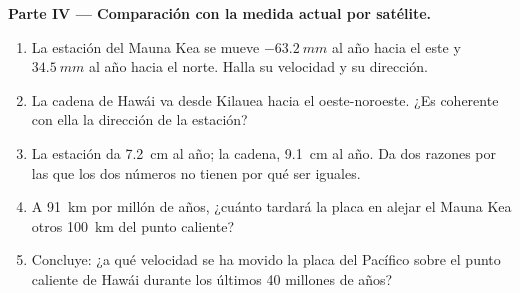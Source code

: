 \begin{problem}
\medskip
\noindent\textbf{Parte IV --- Comparación con la medida actual por satélite.}
\begin{enumerate}[resume]
  \item La estación del Mauna Kea se mueve $\qty{-63.2}{mm}$ al año hacia el
        este y $\qty{+34.5}{mm}$ al año hacia el norte. Halla su velocidad y su
        dirección.
  \item La cadena de Hawái va desde Kilauea hacia el oeste-noroeste. ¿Es
        coherente con ella la dirección de la estación?
  \item La estación da \qty{7.2}{cm} al año; la cadena, \qty{9.1}{cm} al año.
        Da dos razones por las que los dos números no tienen por qué ser iguales.
  \item A \qty{91}{km} por millón de años, ¿cuánto tardará la placa en alejar
        el Mauna Kea otros \qty{100}{km} del punto caliente?
  \item Concluye: ¿a qué velocidad se ha movido la placa del Pacífico sobre el
        punto caliente de Hawái durante los últimos 40 millones de años?
\end{enumerate}
\end{problem}

